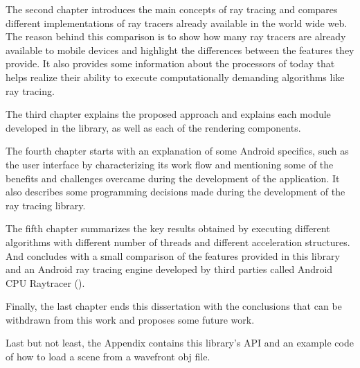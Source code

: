 \par
The second chapter introduces the main concepts of ray tracing and compares different implementations of ray tracers already available in the world wide web.
The reason behind this comparison is to show how many ray tracers are already available to mobile devices and highlight the differences between the features they provide.
It also provides some information about the processors of today that helps realize their ability to execute computationally demanding algorithms like ray tracing.

\par
The third chapter explains the proposed approach and explains each module developed in the library, as well as each of the rendering components.

\par
The fourth chapter starts with an explanation of some Android specifics, such as the user interface by characterizing its work flow and mentioning some of the benefits and challenges overcame during the development of the application.
It also describes some programming decisions made during the development of the ray tracing library.

\par
The fifth chapter summarizes the key results obtained by executing different algorithms with different number of threads and different acceleration structures.
And concludes with a small comparison of the features provided in this library and an Android ray tracing engine developed by third parties called Android CPU Raytracer (\cite{Android_CPU_Raytracer}).

\par
Finally, the last chapter ends this dissertation with the conclusions that can be withdrawn from this work and proposes some future work.

\par
Last but not least, the Appendix contains this library's API and an example code of how to load a scene from a wavefront obj file.